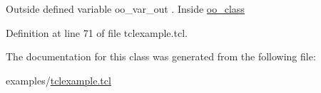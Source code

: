 Outside defined variable {\ttfamily oo\+\_\+var\+\_\+out} . Inside \hyperlink{classns_1_1oo__class}{oo\+\_\+class} 

Definition at line 71 of file tclexample.\+tcl.



The documentation for this class was generated from the following file\+:\begin{DoxyCompactItemize}
\item 
examples/\hyperlink{tclexample_8tcl}{tclexample.\+tcl}\end{DoxyCompactItemize}
